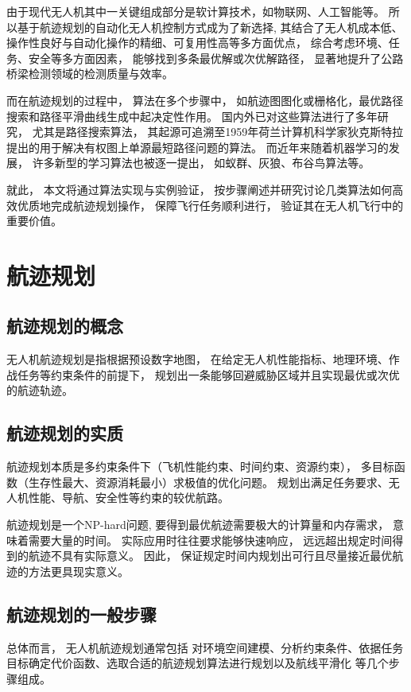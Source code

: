 \documentclass[oneside,UTF8]{ctexart}
\numberwithin{figure}{section} %
\begin{document}
由于现代无人机其中一关键组成部分是软计算技术，如物联网、人工智能等\textsuperscript{\cite{addref1}}。
所以基于航迹规划的自动化无人机控制方式成为了新选择,
其结合了无人机成本低、操作性良好与自动化操作的精细、可复用性高等多方面优点，
综合考虑环境、任务、安全等多方面因素，
能够找到多条最优解或次优解路径，
显著地提升了公路桥梁检测领域的检测质量与效率。

而在航迹规划的过程中，
算法在多个步骤中，
如航迹图图化或栅格化，最优路径搜索和路径平滑曲线生成中起决定性作用。
国内外已对这些算法进行了多年研究，
尤其是路径搜索算法，
其起源可追溯至1959年荷兰计算机科学家狄克斯特拉提出的用于解决有权图上单源最短路径问题的算法。
而近年来随着机器学习的发展，
许多新型的学习算法也被逐一提出，
如蚁群、灰狼、布谷鸟算法等。

就此，
本文将通过算法实现与实例验证，
按步骤阐述并研究讨论几类算法如何高效优质地完成航迹规划操作，
保障飞行任务顺利进行，
验证其在无人机飞行中的重要价值。
\newpage\section{航迹规划}

\subsection{航迹规划的概念}
无人机航迹规划是指根据预设数字地图，
在给定无人机性能指标、地理环境、作战任务等约束条件的前提下，
规划出一条能够回避威胁区域并且实现最优或次优的航迹轨迹。

\subsection{航迹规划的实质}
航迹规划本质是多约束条件下（飞机性能约束、时间约束、资源约束），
多目标函数（生存性最大、资源消耗最小）求极值的优化问题。
规划出满足任务要求、无人机性能、导航、安全性等约束的较优航路。

航迹规划是一个NP-hard问题,
要得到最优航迹需要极大的计算量和内存需求，
意味着需要大量的时间。
实际应用时往往要求能够快速响应，
远远超出规定时间得到的航迹不具有实际意义。
因此，
保证规定时间内规划出可行且尽量接近最优航迹的方法更具现实意义。

\subsection{航迹规划的一般步骤}
总体而言，
无人机航迹规划通常包括
对环境空间建模、分析约束条件、依据任务目标确定代价函数、选取合适的航迹规划算法进行规划以及航线平滑化
等几个步骤组成\textsuperscript{\cite{ref3}}。
\end{document}
